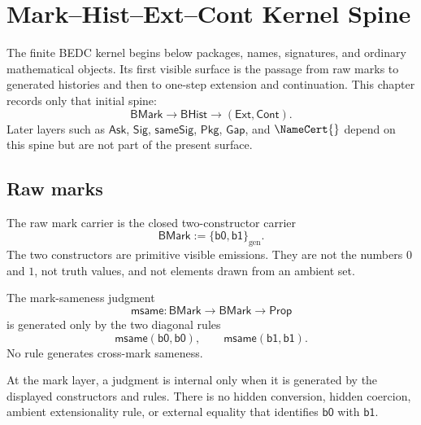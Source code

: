\chapter{Mark--Hist--Ext--Cont Kernel Spine}
\label{ch:visions-mark-hist-ext-cont-spine}

The finite BEDC kernel begins below packages, names, signatures, and
ordinary mathematical objects.  Its first visible surface is the passage
from raw marks to generated histories and then to one-step extension and
continuation.  This chapter records only that initial spine:
$$
\mathsf{BMark}
\longrightarrow
\mathsf{BHist}
\longrightarrow
(\mathsf{Ext},\mathsf{Cont}).
$$
Later layers such as $\mathsf{Ask}$, $\mathsf{Sig}$, $\mathsf{sameSig}$,
$\mathsf{Pkg}$, $\mathsf{Gap}$, and $\NameCert{}$ depend on this spine but
are not part of the present surface.

\section{Raw marks}
\label{sec:mark-hist-ext-cont-raw-marks}

\begin{definition}
\label{def:kernel-spine-raw-mark-carrier}
The raw mark carrier is the closed two-constructor carrier
$$
\mathsf{BMark}:=\{\mathsf{b0},\mathsf{b1}\}_{\mathrm{gen}}.
$$
The two constructors are primitive visible emissions.  They are not the
numbers $0$ and $1$, not truth values, and not elements drawn from an
ambient set.
\end{definition}

\begin{definition}
\label{def:kernel-spine-mark-sameness}
The mark-sameness judgment
$$
\mathsf{msame}:\mathsf{BMark}\to\mathsf{BMark}\to\mathsf{Prop}
$$
is generated only by the two diagonal rules
$$
\mathsf{msame}(\mathsf{b0},\mathsf{b0}),
\qquad
\mathsf{msame}(\mathsf{b1},\mathsf{b1}).
$$
No rule generates cross-mark sameness.
\end{definition}

\begin{principle}
\label{prin:kernel-spine-mark-closed-generation}
At the mark layer, a judgment is internal only when it is generated by the
displayed constructors and rules.  There is no hidden conversion, hidden
coercion, ambient extensionality rule, or external equality that identifies
$\mathsf{b0}$ with $\mathsf{b1}$.
\end{principle}

